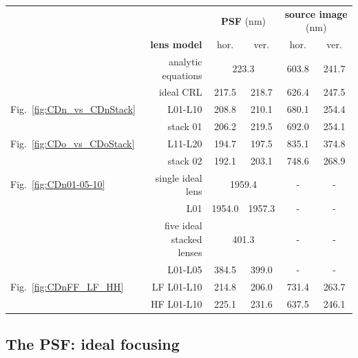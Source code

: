 \begin{refsection}
\begin{table}[h]
\centering
\begin{tabular}{lrcccc}\hline \hline
&                        &\multicolumn{2}{c}{\textbf{PSF} (nm)}   &\multicolumn{2}{c}{\textbf{source image} (nm)}\\
&\textbf{lens model}     &hor.           &ver.                    &hor.            &ver. \\ \cline{2-6}
&analytic equations       &\multicolumn{2}{c}{223.3}           &603.8           &241.7 \\
&ideal CRL               &217.5          &218.7                   &626.4           &247.5 \\ \hline
Fig.~\ref{fig:CDn_vs_CDnStack} &L01-L10  &208.8  &210.1           &680.1           &254.4 \\
&stack 01                &206.2          &219.5                   &692.0           &254.1\\ \hline
Fig.~\ref{fig:CDo_vs_CDoStack} &L11-L20  &194.7  &197.5           &835.1           &374.8 \\
&stack 02                &192.1          &203.1                   &748.6           &268.9 \\ \hline
Fig.~\ref{fig:CDn01-05-10}&single ideal lens  &\multicolumn{2}{c}{1959.4}   & -    & -\\
&L01                     &1954.0         &1957.3                  & -              & - \\
&five ideal stacked lenses  &\multicolumn{2}{c}{401.3}            & -              & - \\
&L01-L05                 &384.5       &399.0                      & -              & - \\ \hline
Fig.~\ref{fig:CDnFF_LF_HH} &LF L01-L10  &214.8     &206.0         & 731.4          &263.7 \\
&HF L01-L10              &225.1      &231.6                       & 637.5          &246.1 \\
\hline \hline
\end{tabular}
\end{table}{}


\subsection{The PSF: ideal focusing}\label{sec:psf_sim}


\end{refsection}
